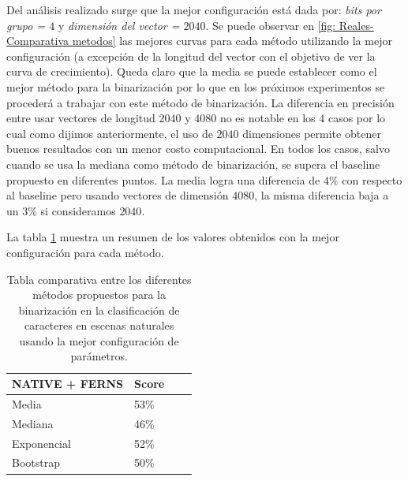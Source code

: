 	Del análisis realizado surge que la mejor configuración está dada por: \textit{bits por grupo = $4$} y \textit{dimensión del vector = $2040$}. Se puede observar en \ref{fig: Reales-Comparativa metodos} las mejores curvas para cada método utilizando la mejor configuración (a excepción de la longitud del vector con el objetivo de ver la curva de crecimiento). Queda claro que la media se puede establecer como el mejor método para la binarización por lo que en los próximos experimentos se procederá a trabajar con este método de binarización. La diferencia en precisión entre usar vectores de longitud $2040$ y $4080$ no es notable en los $4$ casos por lo cual como dijimos anteriormente, el uso de $2040$ dimensiones permite obtener buenos resultados con un menor costo computacional. En todos los casos, salvo cuando se usa la mediana como método de binarización, se supera el baseline propuesto en diferentes puntos. La media logra una diferencia de $4\%$ con respecto al baseline pero usando vectores de dimensión $4080$, la misma diferencia baja a un $3\%$ si consideramos $2040$.

	La tabla \ref{table: reales-comparativa} muestra un resumen de los valores obtenidos con la mejor configuración para cada método.

	\begin{table}
		\centering
		\begin{tabular}{ | l | l | l | p{5cm} |}
    			\hline
    				\textbf{NATIVE + FERNS} & \textbf{Score} \\ \hline
    				Media & 53\% \\ \hline
    				Mediana & 46\%\\ \hline
    				Exponencial & 52\% \\ \hline
    				Bootstrap & 50\%\\
    			\hline
    		\end{tabular}
    		\caption[Resultados imágenes naturales]{Tabla comparativa entre los diferentes métodos propuestos para la binarización en la clasificación de caracteres en escenas naturales usando la mejor configuración de parámetros.}
    		\label{table: reales-comparativa}
    	\end{table}





	